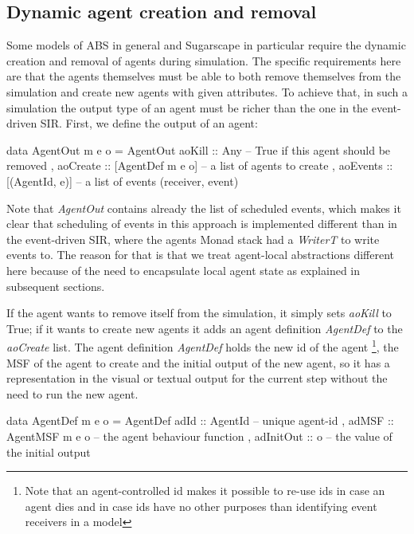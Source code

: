 \subsection{Dynamic agent creation and removal}
Some models of ABS in general and Sugarscape in particular require the dynamic creation and removal of agents during simulation. The specific requirements here are that the agents themselves must be able to both remove themselves from the simulation and create new agents with given attributes. To achieve that, in such a simulation the output type of an agent must be richer than the one in the event-driven SIR. First, we define the output of an agent:

\begin{HaskellCode}
data AgentOut m e o = AgentOut
  { aoKill   :: Any              -- True if this agent should be removed 
  , aoCreate :: [AgentDef m e o] -- a list of agents to create
  , aoEvents :: [(AgentId, e)]   -- a list of events (receiver, event)
  }
\end{HaskellCode}

Note that \textit{AgentOut} contains already the list of scheduled events, which makes it clear that scheduling of events in this approach is implemented different than in the event-driven SIR, where the agents Monad stack had a \textit{WriterT} to write events to. The reason for that is that we treat agent-local abstractions different here because of the need to encapsulate local agent state as explained in subsequent sections.

If the agent wants to remove itself from the simulation, it simply sets \textit{aoKill} to True; if it wants to create new agents it adds an agent definition \textit{AgentDef} to the \textit{aoCreate} list. The agent definition \textit{AgentDef} holds the new id of the agent \footnote{Note that an agent-controlled id makes it possible to re-use ids in case an agent dies and in case ids have no other purposes than identifying event receivers in a model}, the MSF of the agent to create and the initial output of the new agent, so it has a representation in the visual or textual output for the current step without the need to run the new agent.

\begin{HaskellCode}
data AgentDef m e o = AgentDef
  { adId      :: AgentId         -- unique agent-id
  , adMSF     :: AgentMSF m e o  -- the agent behaviour function
  , adInitOut :: o               -- the value of the initial output
  }
\end{HaskellCode}

